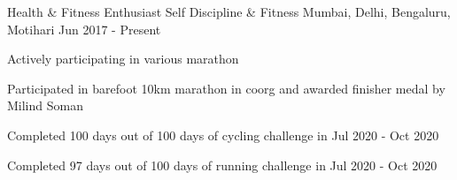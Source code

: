\begin{cventries}
\cventry
    {Health \& Fitness Enthusiast} %
    {Self Discipline \& Fitness} %
    {Mumbai, Delhi, Bengaluru, Motihari} %
    {Jun 2017 - Present} %
    {
      \begin{cvitems} %
        \item {Actively participating in various marathon}
        \item {Participated in barefoot 10km marathon in coorg and awarded finisher medal by Milind Soman }
        \item {Completed 100 days out of 100 days of cycling challenge in Jul 2020 - Oct 2020}
        \item {Completed 97 days out of 100 days of running challenge in Jul 2020 - Oct 2020}
      \end{cvitems}
    }

\end{cventries}



